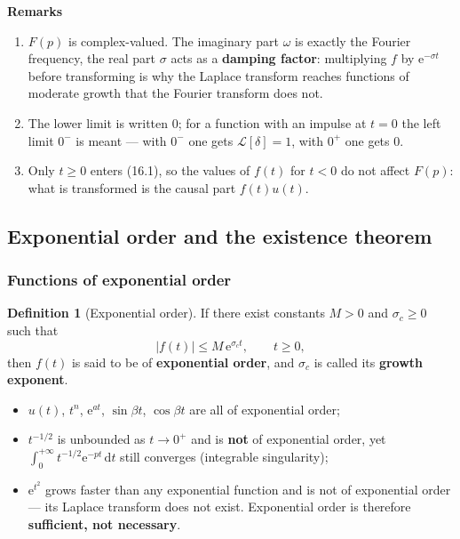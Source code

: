 \documentclass[11pt,a4paper]{article}
\theoremstyle{definition}
\newtheorem{definition}{Definition}[section]
\theoremstyle{plain}
\begin{document}
\textbf{Remarks}
\begin{enumerate}
    \item $F(p)$ is complex-valued. The imaginary part $\omega$ is exactly the Fourier frequency,
          the real part $\sigma$ acts as a \textbf{damping factor}: multiplying $f$ by
          $\mathrm{e}^{-\sigma t}$ before transforming is why the Laplace transform reaches
          functions of moderate growth that the Fourier transform does not.
    \item The lower limit is written $0$; for a function with an impulse at $t=0$ the left limit
          $0^{-}$ is meant --- with $0^{-}$ one gets $\mathcal{L}[\delta]=1$, with $0^{+}$ one
          gets $0$.
    \item Only $t\ge 0$ enters (16.1), so the values of $f(t)$ for $t<0$ do not affect $F(p)$:
          what is transformed is the causal part $f(t)u(t)$.
\end{enumerate}

\clearpage
\subsection{Exponential order and the existence theorem}

\subsubsection{Functions of exponential order}

\begin{definition}[Exponential order]
If there exist constants $M>0$ and $\sigma_c\ge 0$ such that
\begin{equation}
\left|f(t)\right|\le M\,\mathrm{e}^{\sigma_c t},\qquad t\ge 0, \tag{16.4}
\end{equation}
then $f(t)$ is said to be of \textbf{exponential order}, and $\sigma_c$ is called its
\textbf{growth exponent}.
\end{definition}

\begin{itemize}
    \item $u(t)$, $t^n$, $\mathrm{e}^{at}$, $\sin\beta t$, $\cos\beta t$ are all of exponential
          order;
    \item $t^{-1/2}$ is unbounded as $t\to 0^{+}$ and is \textbf{not} of exponential order, yet
          $\int_{0}^{+\infty} t^{-1/2}\mathrm{e}^{-pt}\,\mathrm{d}t$ still converges (integrable
          singularity);
    \item $\mathrm{e}^{t^{2}}$ grows faster than any exponential function and is not of
          exponential order --- its Laplace transform does not exist. Exponential order is
          therefore \textbf{sufficient, not necessary}.
\end{itemize}
\end{document}
